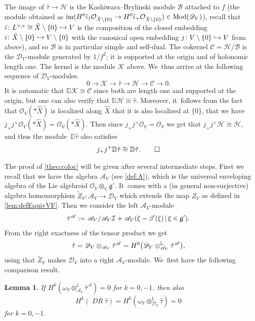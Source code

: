 \documentclass[JEP,XML,SOM,Unicode,published]{cedram}
\let\mathds\mathbb
\newcommand\hto{\mathrel{\lhook\joinrel\to}}
\newtheorem{lem}[thm]{Lemma}
\newcommand{\dC}{{\mathds C}}\let\C\dC
\newcommand{\dL}{{\mathbb L}}
\newcommand{\bD}{{\mathbb D}}\let\mbd\bD
\newcommand{\cA}{\mathscr{A}}
\newcommand{\cB}{\mathcal{B}}
\newcommand{\cC}{\mathcal{C}}
\newcommand{\cD}{\mathscr{D}}
\newcommand{\cH}{\mathcal{H}}
\newcommand{\cI}{\mathcal{I}}
\newcommand{\cK}{\mathcal{K}}
\newcommand{\cO}{\mathcal{O}}\let\O\cO
\newcommand{\frg}{\mathfrak{g}}
\DeclareMathOperator{\DR}{\mathit{DR}}
\DeclareMathOperator{\im}{\textup{im}}
\let\originalleft\left
\let\originalright\right
\renewcommand{\left}{\mathopen{}\mathclose\bgroup\originalleft}
\renewcommand{\right}{\aftergroup\egroup\originalright}
\begin{document}
\begin{exa}
The image of
$\hat{\tau}\to \cH$ is the Kashiwara--Brylinski module $\cB$ attached to
$f$ (\ie the module obtained as
$\im(H^0\hat{\iota}_{\dag}\cO_{\hat{X}\setminus\{0\}}
\to
H^0\hat{\iota}_{+}\cO_{\hat{X}\setminus\{0\}})\in\textup{Mod}(\cD_V)$), recall that
$\hat{\iota} \colon L^{\vee,*}\cong\hat{X}\setminus\{0\}\hto V$ is the composition of the closed embedding $i \colon \hat{X}\setminus\{0\}\hto V\setminus\{0\}$ with the canonical open embedding $j \colon V\setminus\{0\}\hto V$ from above), and so $\cB$ is in particular simple and self-dual. The cokernel $\cC=\cH/\cB$ is the $\cD_V$\nobreakdash-mod\-ule generated by $1/f^2$; it is supported at the origin and of holonomic length one. The kernel is the module $\cK$ above. We~thus arrive at the following sequence of $\cD_V$\nobreakdash-mod\-ules.
\[
0\to \cK \to \hat\tau \to \cH \to \cC \to 0.
\]
It is automatic that $\bD \cK\cong \cC$ since both are length one and supported at the origin, but one can also verify that $\bD \cH \cong \hat\tau$. Moreover, it~follows from the fact that $\cO_V(*\hat{X})$ is localized along $\hat{X}$ that it is also localized at $\{0\}$, \ie that we have $j_+j^+\cO_V(*\hat{X})
=\cO_V(*\hat{X})$. Then since $j_+j^+\cO_V=\cO_V$ we get that $j_+j^+\cH\cong\cH$, and thus the module~$\bD \hat\tau$ also satisfies
\[
j_+j^+ \bD\hat\tau \cong \bD \hat\tau.\qedhere
\]
\end{exa}

The proof of \cref{theo:coloc} will be given after several intermediate steps. First we recall that we have the algebra
$\cA_V$ (see \cref{def:A}), which is the universal enveloping algebra of the Lie algebroid $\cO_V\otimes_\dC \frg'$. It~comes with a (in general non-surjective) algebra homomorphism $\widetilde{Z}_V\colon\cA_V\to \cD_V$ which extends the map $Z_V$ as defined
in \cref{lem:defEquivVF}. Then we consider the left $\cA_V$\nobreakdash-mod\-ule
\[
\hat{\tau}^\cA:=\cA_V/\cA_V \cI+\cA_V\left(\xi-\beta'(\xi)\,|\,\xi\in\frg'\right).
\]
From the right exactness of the tensor product we get
\[
\hat{\tau} = \cD_V\otimes_{\cA_V} \hat{\tau}^\cA =
H^0\left(\cD_V\otimes^\dL_{\cA_V} \hat{\tau}^\cA\right),
\]
using that $\widetilde{Z}_V$ makes $\cD_V$ into a right $\cA_V$\nobreakdash-mod\-ule. We~first have the following comparison result.

\begin{lem}\label{lem:Spect-1}
If $H^k(\omega_V\otimes^\dL_{\cA_V}\hat{\tau}^\cA)=0$ for $k=0,-1$, then also
\[
H^k(\DR \hat\tau)=H^k(\omega_V\otimes^\dL_{\cD_V} \hat{\tau})=0
\]
for $k=0,-1$.
\end{lem}
\end{document}
